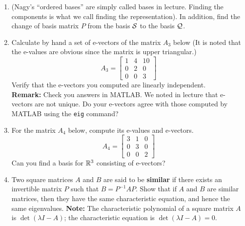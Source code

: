 \documentclass[letterpaper]{article}
\begin{document}
\begin{enumerate}


\item {} (Nagy's ``ordered bases'' are simply called bases in lecture. Finding the components is what we call finding the representation).  In addition, find the change of basis matrix $P$ from the basis $\cal S$ to the basis $\cal Q$.


\item Calculate by hand a set of e-vectors of the matrix $A_3$ below (It is noted
that the e-values are obvious since the matrix is upper triangular.)
$$A_3=\left[ \begin{array}{ccc} 1 & 4 & 10 \\ 0 & 2 & 0 \\ 0& 0& 3 \end{array} \right] $$
Verify that the e-vectors you computed are linearly independent. \\

\textbf{Remark:} Check you answers in MATLAB.  We noted in lecture that e-vectors are not unique. Do your e-vectors agree with those computed by MATLAB using the \texttt{eig} command?

\item For the matrix $A_4$ below, compute its e-values and e-vectors.
 $$A_4=\left[ \begin{array}{ccc} 3 & 1 &0 \\ 0 & 3 & 0 \\ 0& 0& 2 \end{array} \right] $$
 Can you find a basis for $\mathbb R^3$ consisting of e-vectors?

\item Two square matrices $A$ and $B$ are said to be \textbf{similar} if there exists an invertible matrix $P$ such that
$B=P^{-1}AP$. Show that if $A$ and $B$ are similar matrices, then
they have the same characteristic equation, and hence the same
eigenvalues. \textbf{Note:} The characteristic polynomial of a
square matrix $A$ is $\det \left( \lambda I - A \right)$; the
characteristic equation is $\det \left( \lambda I - A \right)=0$.\\



\end{enumerate}
\end{document}
